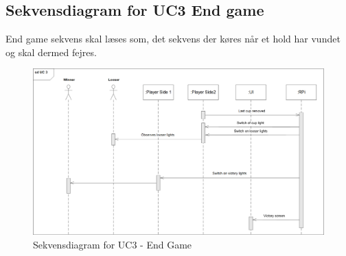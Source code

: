 \documentclass[Arkitektur/System_main.tex]{subfiles}
\begin{document}
\subsection{Sekvensdiagram for UC3 End game}
End game sekvens skal læses som, det sekvens der køres når et hold har vundet og skal dermed fejres.
\begin{figure}
    \centering 
    \includegraphics[width=\linewidth]{Arkitektur/Sekvensdiagrammer/graphics/sd_UC3.png}
    \caption{Sekvensdiagram for UC3 - End Game}
    \label{fig:sd_UC3}
\end{figure}
\newpage
\end{document}
